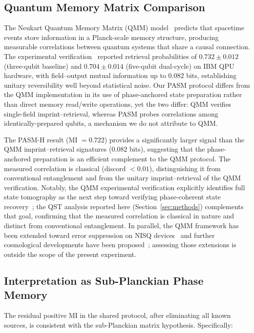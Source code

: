 \documentclass[12pt,a4paper]{article}
\begin{document}
\subsection{Quantum Memory Matrix Comparison}

The Neukart Quantum Memory Matrix (QMM) model~\cite{neukart2025,neukart2026qip} predicts that spacetime events store information in a Planck-scale memory structure, producing measurable correlations between quantum systems that share a causal connection. The experimental verification~\cite{neukart2026qip} reported retrieval probabilities of $0.732 \pm 0.012$ (three-qubit baseline) and $0.704 \pm 0.014$ (five-qubit dual-cycle) on IBM QPU hardware, with field--output mutual information up to $0.082$ bits, establishing unitary reversibility well beyond statistical noise. Our PASM protocol differs from the QMM implementation in its use of phase-anchored state preparation rather than direct memory read/write operations, yet the two differ: QMM verifies single-field imprint--retrieval, whereas PASM probes correlations among identically-prepared qubits, a mechanism we do not attribute to QMM.

The PASM-H result (MI $= 0.722$) provides a significantly larger signal than the QMM imprint--retrieval signatures ($0.082$ bits), suggesting that the phase-anchored preparation is an efficient complement to the QMM protocol. The measured correlation is classical (discord $< 0.01$), distinguishing it from conventional entanglement and from the unitary imprint--retrieval of the QMM verification. Notably, the QMM experimental verification explicitly identifies full state tomography as the next step toward verifying phase-coherent state recovery~\cite{neukart2026qip}; the QST analysis reported here (Section~\ref{sec:methods}) complements that goal, confirming that the measured correlation is classical in nature and distinct from conventional entanglement. In parallel, the QMM framework has been extended toward error suppression on NISQ devices~\cite{neukart2026qec} and further cosmological developments have been proposed~\cite{neukart2025dm,neukart2025de,neukart2025cycle,neukart2025pbh,neukart2026em}; assessing those extensions is outside the scope of the present experiment.

\subsection{Interpretation as Sub-Planckian Phase Memory}

The residual positive MI in the shared protocol, after eliminating all known sources, is consistent with the sub-Planckian matrix hypothesis. Specifically:
\end{document}
